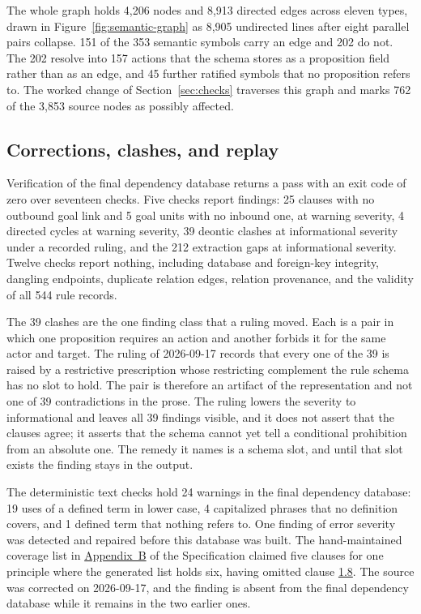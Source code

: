The whole graph holds 4{,}206 nodes and 8{,}913 directed edges across eleven types, drawn in Figure~\ref{fig:semantic-graph} as 8{,}905 undirected lines after eight parallel pairs collapse. 151 of the 353 semantic symbols carry an edge and 202 do not. The 202 resolve into 157 actions that the schema stores as a proposition field rather than as an edge, and 45 further ratified symbols that no proposition refers to. The worked change of Section~\ref{sec:checks} traverses this graph and marks 762 of the 3{,}853 source nodes as possibly affected.

\subsection{Corrections, clashes, and replay}

Verification of the final dependency database returns a pass with an exit code of zero over seventeen checks. Five checks report findings: 25 clauses with no outbound goal link and 5 goal units with no inbound one, at warning severity, 4 directed cycles at warning severity, 39 deontic clashes at informational severity under a recorded ruling, and the 212 extraction gaps at informational severity. Twelve checks report nothing, including database and foreign-key integrity, dangling endpoints, duplicate relation edges, relation provenance, and the validity of all 544 rule records.

The 39 clashes are the one finding class that a ruling moved. Each is a pair in which one proposition requires an action and another forbids it for the same actor and target. The ruling of 2026-09-17 records that every one of the 39 is raised by a restrictive prescription whose restricting complement the rule schema has no slot to hold. The pair is therefore an artifact of the representation and not one of 39 contradictions in the prose. The ruling lowers the severity to informational and leaves all 39 findings visible, and it does not assert that the clauses agree; it asserts that the schema cannot yet tell a conditional prohibition from an absolute one. The remedy it names is a schema slot, and until that slot exists the finding stays in the output.

The deterministic text checks hold 24 warnings in the final dependency database: 19 uses of a defined term in lower case, 4 capitalized phrases that no definition covers, and 1 defined term that nothing refers to. One finding of error severity was detected and repaired before this database was built. The hand-maintained coverage list in \hyperlink{nss-appB}{Appendix~B} of the Specification claimed five clauses for one principle where the generated list holds six, having omitted clause \hyperlink{nss-1.8}{1.8}. The source was corrected on 2026-09-17, and the finding is absent from the final dependency database while it remains in the two earlier ones.

